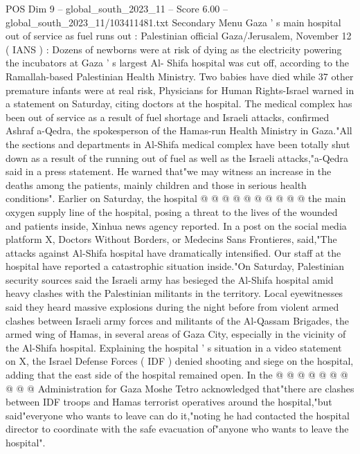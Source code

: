 \begin{textsample}{POS Dim 9 – global\_south\_2023\_11 – Score 6.00 – global\_south\_2023\_11/103411481.txt}  \label{ex:f9_pos_029}
Secondary Menu Gaza ' s main hospital out of service as fuel runs out : Palestinian official Gaza/Jerusalem, November 12 ( IANS ) : Dozens of newborns were at risk of dying as the electricity powering the incubators at Gaza ' s largest Al- Shifa hospital was cut off, according to the Ramallah-based Palestinian Health Ministry.
Two babies have died while 37 other premature infants were at real risk, Physicians for Human Rights-Israel warned in a statement on Saturday, citing doctors at the hospital.
The medical complex has been out of service as a result of fuel shortage and Israeli attacks, confirmed Ashraf a-Qedra, the spokesperson of the Hamas-run Health Ministry in Gaza."All the sections and departments in Al-Shifa medical complex have been totally shut down as a result of the running out of fuel as well as the Israeli attacks,"a-Qedra said in a press statement.
He warned that"we may witness an increase in the deaths among the patients, mainly children and those in serious health conditions".
Earlier on Saturday, the hospital @ @ @ @ @ @ @ @ @ @ the main oxygen supply line of the hospital, posing a threat to the lives of the wounded and patients inside, Xinhua news agency reported.
In a post on the social media platform X, Doctors Without Borders, or Medecins Sans Frontieres, said,"The attacks against Al-Shifa hospital have dramatically intensified.
Our staff at the hospital have reported a catastrophic situation inside."On Saturday, Palestinian security sources said the Israeli army has besieged the Al-Shifa hospital amid heavy clashes with the Palestinian militants in the territory.
Local eyewitnesses said they heard massive explosions during the night before from violent armed clashes between Israeli army forces and militants of the Al-Qassam Brigades, the armed wing of Hamas, in several areas of Gaza City, especially in the vicinity of the Al-Shifa hospital.
Explaining the hospital ' s situation in a video statement on X, the Israel Defense Forces ( IDF ) denied shooting and siege on the hospital, adding that the east side of the hospital remained open.
In the @ @ @ @ @ @ @ @ @ @ Administration for Gaza Moshe Tetro acknowledged that"there are clashes between IDF troops and Hamas terrorist operatives around the hospital,"but said"everyone who wants to leave can do it,"noting he had contacted the hospital director to coordinate with the safe evacuation of"anyone who wants to leave the hospital".

\end{textsample}
